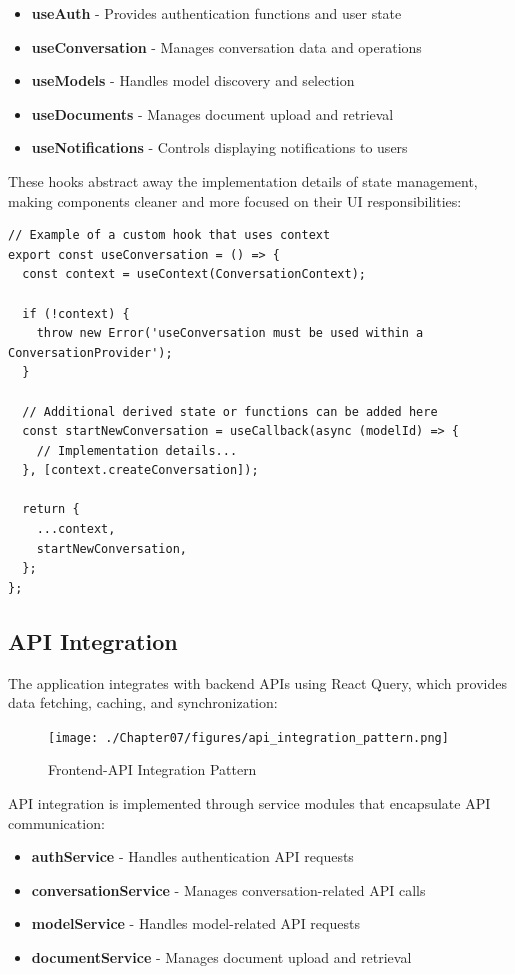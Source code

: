 \begin{itemize}
  \item \textbf{useAuth} - Provides authentication functions and user state
  \item \textbf{useConversation} - Manages conversation data and operations
  \item \textbf{useModels} - Handles model discovery and selection
  \item \textbf{useDocuments} - Manages document upload and retrieval
  \item \textbf{useNotifications} - Controls displaying notifications to users
\end{itemize}

These hooks abstract away the implementation details of state management, making components cleaner and more focused on their UI responsibilities:

\begin{verbatim}
// Example of a custom hook that uses context
export const useConversation = () => {
  const context = useContext(ConversationContext);
  
  if (!context) {
    throw new Error('useConversation must be used within a ConversationProvider');
  }
  
  // Additional derived state or functions can be added here
  const startNewConversation = useCallback(async (modelId) => {
    // Implementation details...
  }, [context.createConversation]);
  
  return {
    ...context,
    startNewConversation,
  };
};
\end{verbatim}

\subsection{API Integration}

The application integrates with backend APIs using React Query, which provides data fetching, caching, and synchronization:

\begin{figure}[p]
    \centering
    \texttt{[image: ./Chapter07/figures/api\_integration\_pattern.png]}
    \caption{Frontend-API Integration Pattern}
    \label{fig:api-integration-pattern}
\end{figure}
\clearpage

API integration is implemented through service modules that encapsulate API communication:

\begin{itemize}
  \item \textbf{authService} - Handles authentication API requests
  \item \textbf{conversationService} - Manages conversation-related API calls
  \item \textbf{modelService} - Handles model-related API requests
  \item \textbf{documentService} - Manages document upload and retrieval
\end{itemize}

